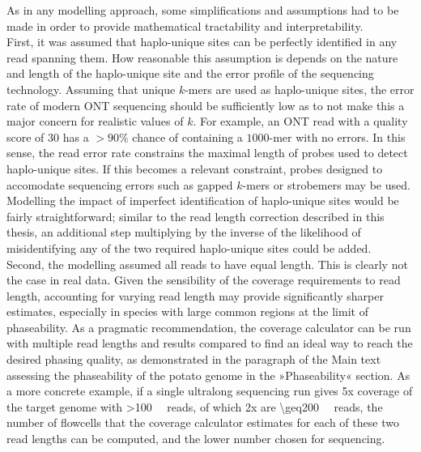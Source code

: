 As in any modelling approach, some simplifications and assumptions had to be made in order to provide mathematical tractability and interpretability.\\
First, it was assumed that haplo-unique sites can be perfectly identified in any read spanning them.
How reasonable this assumption is depends on the nature and length of the haplo-unique site and the error profile of the sequencing technology.
Assuming that unique $k$-mers are used as haplo-unique sites, the error rate of modern ONT sequencing should be sufficiently low as to not make this a major concern for realistic values of $k$. %
For example, an ONT read with a quality score of 30 has a $>90\%$ chance of containing a $1000$-mer with no errors.
In this sense, the read error rate constrains the maximal length of probes used to detect haplo-unique sites.
If this becomes a relevant constraint, probes designed to accomodate sequencing errors such as gapped $k$-mers or strobemers may be used\cite{mohammad-noori24, zentgraf25}.\\
Modelling the impact of imperfect identification of haplo-unique sites would be fairly straightforward; similar to the read length correction described in this thesis, an additional step multiplying by the inverse of the likelihood of misidentifying any of the two required haplo-unique sites could be added.\\
Second, the modelling assumed all reads to have equal length.
This is clearly not the case in real data.
Given the sensibility of the coverage requirements to read length, accounting for varying read length may provide significantly sharper estimates, especially  in species with large common regions at the limit of phaseability.
As a pragmatic recommendation, the coverage calculator can be run with multiple read lengths and results compared to find an ideal way to reach the desired phasing quality, as demonstrated in the paragraph of the Main text assessing the phaseability of the potato genome in the »Phaseability« section.
As a more concrete example, if a single ultralong sequencing run gives 5x coverage of the target genome with >\qty{100}{\kilo\bp} reads, of which 2x are \qty{\geq200}{\kilo\bp} reads, the number of flowcells that the coverage calculator estimates for each of these two read lengths can be computed, and the lower number chosen for sequencing.\\
